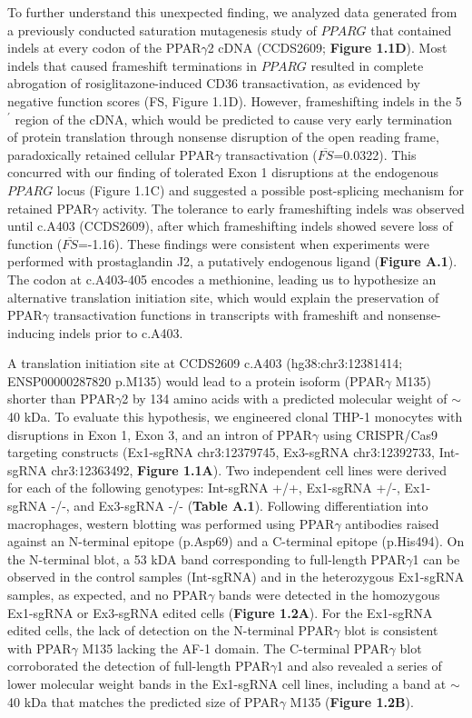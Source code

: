To further understand this unexpected finding, we analyzed data generated from a previously conducted saturation mutagenesis study of \(PPARG\) that contained indels at every codon of the PPAR$\gamma$2 cDNA (CCDS2609; \textbf{Figure 1.1D})\cite{Majithia2016-bm}. Most indels that caused frameshift terminations in \(PPARG\) resulted in complete abrogation of rosiglitazone-induced CD36 transactivation, as evidenced by negative function scores (FS, Figure 1.1D). However, frameshifting indels in the 5$^{\prime}$ region of the cDNA, which would be predicted to cause very early termination of protein translation through nonsense disruption of the open reading frame, paradoxically retained cellular PPAR$\gamma$ transactivation ($\overline{FS}$=0.0322). This concurred with our finding of tolerated Exon 1 disruptions at the endogenous \(PPARG\) locus (Figure 1.1C) and suggested a possible post-splicing mechanism for retained PPAR$\gamma$ activity. The tolerance to early frameshifting indels was observed until c.A403 (CCDS2609), after which frameshifting indels showed severe loss of function ($\overline{FS}$=-1.16). These findings were consistent when experiments were performed with prostaglandin J2, a putatively endogenous ligand\cite{Majithia2016-bm} (\textbf{Figure A.1}). The codon at c.A403-405 encodes a methionine, leading us to hypothesize an alternative translation initiation site, which would explain the preservation of PPAR$\gamma$ transactivation functions in transcripts with frameshift and nonsense-inducing indels prior to c.A403.

A translation initiation site at CCDS2609 c.A403 (hg38:chr3:12381414; ENSP00000287820 p.M135) would lead to a protein isoform (PPAR$\gamma$ M135) shorter than PPAR$\gamma$2 by 134 amino acids with a predicted molecular weight of $\sim$40 kDa. To evaluate this hypothesis, we engineered clonal THP-1 monocytes with disruptions in Exon 1, Exon 3, and an intron of PPAR$\gamma$ using CRISPR/Cas9 targeting constructs (Ex1-sgRNA chr3:12379745, Ex3-sgRNA chr3:12392733, Int-sgRNA chr3:12363492, \textbf{Figure 1.1A}). Two independent cell lines were derived for each of the following genotypes: Int-sgRNA +/+, Ex1-sgRNA +/-, Ex1-sgRNA -/-, and Ex3-sgRNA -/- (\textbf{Table A.1}). Following differentiation into macrophages, western blotting was performed using PPAR$\gamma$ antibodies raised against an N-terminal epitope (p.Asp69) and a C-terminal epitope (p.His494). On the N-terminal blot, a 53 kDA band corresponding to full-length PPAR$\gamma$1 can be observed in the control samples (Int-sgRNA) and in the heterozygous Ex1-sgRNA samples, as expected, and no PPAR$\gamma$ bands were detected in the homozygous Ex1-sgRNA or Ex3-sgRNA edited cells (\textbf{Figure 1.2A}). For the Ex1-sgRNA edited cells, the lack of detection on the N-terminal PPAR$\gamma$ blot is consistent with PPAR$\gamma$ M135 lacking the AF-1 domain. The C-terminal PPAR$\gamma$ blot corroborated the detection of full-length PPAR$\gamma$1 and also revealed a series of lower molecular weight bands in the Ex1-sgRNA cell lines, including a band at $\sim$40 kDa that matches the predicted size of PPAR$\gamma$ M135 (\textbf{Figure 1.2B}).

